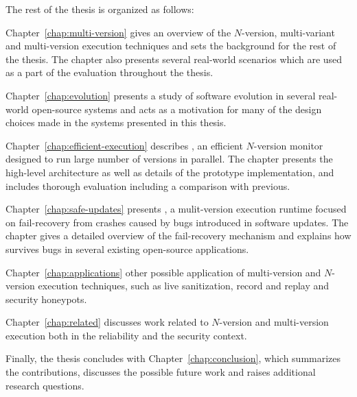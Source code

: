The rest of the thesis is organized as follows:

\begin{chapterdescription}
\item[Chapter~\ref{chap:multi-version}] gives an overview of the $N$-version,
multi-variant and multi-version execution techniques and sets the background
for the rest of the thesis. The chapter also presents several real-world scenarios
which are used as a part of the evaluation throughout the thesis.

\item[Chapter~\ref{chap:evolution}] presents a study of software evolution in several
real-world open-source systems and acts as a motivation for many of the design
choices made in the systems presented in this thesis.

\item[Chapter~\ref{chap:efficient-execution}] describes \varan, an efficient $N$-version
monitor designed to run large number of versions in parallel. The chapter presents
the high-level architecture as well as details of the prototype implementation,
and includes thorough evaluation including a comparison with previous.

\item[Chapter~\ref{chap:safe-updates}] presents \mx, a mulit-version execution runtime focused
on fail-recovery from crashes caused by bugs introduced in software updates. The chapter
gives a detailed overview of the fail-recovery mechanism and explains how \mx survives
bugs in several existing open-source applications.

\item[Chapter~\ref{chap:applications}] other possible application of multi-version and $N$-version
execution techniques, such as live sanitization, record and replay and security honeypots.

\item[Chapter~\ref{chap:related}] discusses work related to $N$-version and multi-version
execution both in the reliability and the security context.
\end{chapterdescription}

Finally, the thesis concludes with Chapter~\ref{chap:conclusion}, which
summarizes the contributions, discusses the possible future work and raises
additional research questions.


